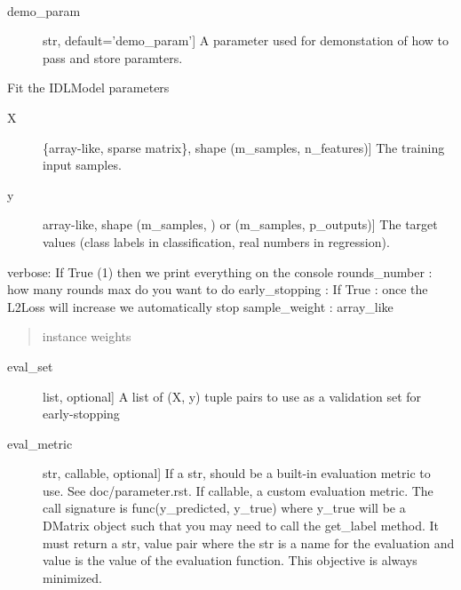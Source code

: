 \documentclass[letterpaper,10pt,english]{sphinxmanual}
\begin{document}
\begin{fulllineitems}
\label{\detokenize{sections/learning:IDL.IDLModel}}~\begin{description}
\item[{demo\_param}] \leavevmode{[}str, default=’demo\_param’{]}
A parameter used for demonstation of how to pass and store paramters.

\end{description}

\begin{fulllineitems}
\label{\detokenize{sections/learning:IDL.IDLModel.fit}}
Fit the IDLModel parameters
\begin{description}
\item[{X}] \leavevmode{[}\{array-like, sparse matrix\}, shape (m\_samples,  n\_features){]}
The training input samples.

\item[{y}] \leavevmode{[}array-like, shape (m\_samples, ) or (m\_samples, p\_outputs){]}
The target values (class labels in classification, real numbers in
regression).

\end{description}

verbose: If True (1) then we print everything on the console
rounds\_number : how many rounds max do you want to do
early\_stopping : If True : once the L2Loss will increase we automatically stop
sample\_weight : array\_like
\begin{quote}

instance weights
\end{quote}
\begin{description}
\item[{eval\_set}] \leavevmode{[}list, optional{]}
A list of (X, y) tuple pairs to use as a validation set for
early-stopping

\item[{eval\_metric}] \leavevmode{[}str, callable, optional{]}
If a str, should be a built-in evaluation metric to use. See
doc/parameter.rst. If callable, a custom evaluation metric. The call
signature is func(y\_predicted, y\_true) where y\_true will be a
DMatrix object such that you may need to call the get\_label
method. It must return a str, value pair where the str is a name
for the evaluation and value is the value of the evaluation
function. This objective is always minimized.


\end{description}
\end{fulllineitems}
\end{fulllineitems}
\end{document}
